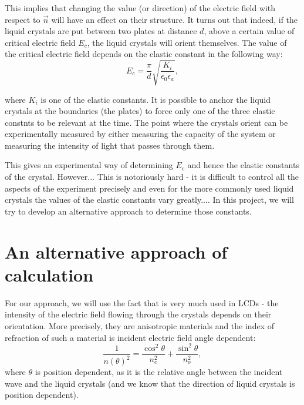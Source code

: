 \documentclass{article}
\begin{document}
This implies that changing the value (or direction) of the electric field with respect to $\vec{n}$ will have an effect on their structure. It turns out that indeed, if the liquid crystals are put between two plates at distance $d$, above a certain value of critical electric field $E_c$, the liquid crystals will orient themselves. The value of the critical electric field depends on the elastic constant in the following way:
\begin{equation*}
E_c = \frac{\pi}{d} \sqrt{\frac{K_i}{\epsilon_0 \epsilon_a}},
\end{equation*}

where $K_i$ is one of the elastic constants. It is possible to anchor the liquid crystals at the boundaries (the plates) to force only one of the three elastic constnts to be relevant at the time. The point where the crystals orient can be experimentally measured by either measuring the capacity of the system or measuring the intensity of light that passes through them.

This gives an experimental way of determining $E_c$ and hence the elastic constants of the crystal. However... This is notoriously hard - it is difficult to control all the aspects of the experiment precisely and even for the more commonly used liquid crystals the values of the elastic constants vary greatly.... In this project, we will try to develop an alternative approach to determine those constants.

\section*{An alternative approach of calculation}

For our approach, we will use the fact that is very much used in LCDs - the intensity of the electric field flowing through the crystals depends on their orientation. 
More precisely, they are anisotropic materials and the index of refraction of such a material is incident electric field angle dependent:
\begin{equation*}
\frac{1}{n(\theta)^2} = \frac{\cos^2 \theta}{n_e^2} + \frac{\sin^2 \theta}{n_o^2},
\end{equation*}
where $\theta$ is position dependent, as it is the relative angle between the incident wave and the liquid crystals (and we know that the direction of liquid crystals is position dependent).
\end{document}
